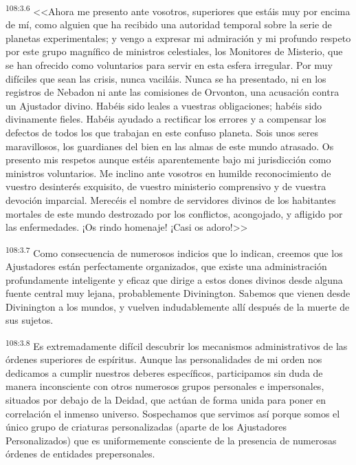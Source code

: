 \documentclass[twoside, 11pt]{book}
\begin{document}
\par
\textsuperscript{108:3.6} <<Ahora me presento ante vosotros, superiores que estáis muy por encima de mí, como alguien que ha recibido una autoridad temporal sobre la serie de planetas experimentales; y vengo a expresar mi admiración y mi profundo respeto por este grupo magnífico de ministros celestiales, los Monitores de Misterio, que se han ofrecido como voluntarios para servir en esta esfera irregular. Por muy difíciles que sean las crisis, nunca vaciláis. Nunca se ha presentado, ni en los registros de Nebadon ni ante las comisiones de Orvonton, una acusación contra un Ajustador divino. Habéis sido leales a vuestras obligaciones; habéis sido divinamente fieles. Habéis ayudado a rectificar los errores y a compensar los defectos de todos los que trabajan en este confuso planeta. Sois unos seres maravillosos, los guardianes del bien en las almas de este mundo atrasado. Os presento mis respetos aunque estéis aparentemente bajo mi jurisdicción como ministros voluntarios. Me inclino ante vosotros en humilde reconocimiento de vuestro desinterés exquisito, de vuestro ministerio comprensivo y de vuestra devoción imparcial. Merecéis el nombre de servidores divinos de los habitantes mortales de este mundo destrozado por los conflictos, acongojado, y afligido por las enfermedades. ¡Os rindo homenaje! ¡Casi os adoro!>>

\par
\textsuperscript{108:3.7} Como consecuencia de numerosos indicios que lo indican, creemos que los Ajustadores están perfectamente organizados, que existe una administración profundamente inteligente y eficaz que dirige a estos dones divinos desde alguna fuente central muy lejana, probablemente Divinington. Sabemos que vienen desde Divinington a los mundos, y vuelven indudablemente allí después de la muerte de sus sujetos.

\par
\textsuperscript{108:3.8} Es extremadamente difícil descubrir los mecanismos administrativos de las órdenes superiores de espíritus. Aunque las personalidades de mi orden nos dedicamos a cumplir nuestros deberes específicos, participamos sin duda de manera inconsciente con otros numerosos grupos personales e impersonales, situados por debajo de la Deidad, que actúan de forma unida para poner en correlación el inmenso universo. Sospechamos que servimos así porque somos el único grupo de criaturas personalizadas (aparte de los Ajustadores Personalizados) que es uniformemente consciente de la presencia de numerosas órdenes de entidades prepersonales.
\end{document}
